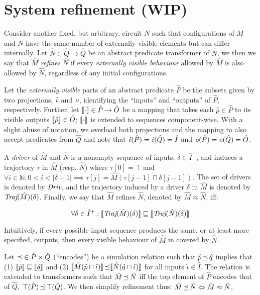 \section{System refinement (WIP)}

Consider another fixed, but arbitrary, circuit $N$ such that configurations of $M$ and $N$ have the same number of externally visible elements but can differ internally. Let $\hat N \in \hat Q \rightarrow \hat Q$ be an abstract predicate transformer of $N$, we then we say that $\hat M$ \textit{refines} $\hat N$ if every \textit{externally visible behaviour} allowed by $\hat M$ is also allowed by $\hat N$, regardless of any initial configurations.

Let the \textit{externally visible} parts of an abstract predicate $\hat P$ be the subsets given by two projections, $\operatorname{\mathit{i}}$ and $\mathit{o}$, identifying the ``inputs'' and ``outputs'' of $\hat P$, respectively. Further, let $\llbracket\cdot\rrbracket \in \hat P \rightarrow \hat O$ be a mapping that takes each $\hat p \in \hat P$ to its visible outputs $\llbracket\hat p\rrbracket \in \hat O$; $\llbracket\cdot\rrbracket$ is extended to sequences component-wise. With a slight abuse of notation, we overload both projections and the mapping to also accept predicates from $\hat Q$ and note that $\operatorname{\mathit{i}}(\hat P) = \operatorname{\mathit{i}}(\hat Q) = \hat I$ and $\mathit{o}(\hat P) = \mathit{o}(\hat Q) = \hat O$.


A \textit{driver} of $\hat M$ and $\hat N$ is a nonempty sequence of inputs, $\delta \in \hat I^{+}$, and induces a trajectory $\tau$ in $\hat M$ (resp. $\hat N$) where $\tau[0] = \top$ and $\forall i \in \mathbb{N} : 0 < i < | \delta + 1 | \implies \tau[j] = \hat M(\tau[j-1] \sqcap \delta[j-1])$. The set of drivers is denoted by $\operatorname{\textit{Driv}}$, and the trajectory induced by a driver $\delta$ in $\hat M$ is denoted by $\operatorname{\textit{Traj}}(\hat M)(\delta)$. Finally, we say that $\hat M$ refines $\hat N$, denoted by $\hat M \approx \hat N$, iff:

\begin{equation*}
\forall \delta \in \hat I^{+} : \llbracket\operatorname{\textit{Traj}}(\hat M)(\delta)\rrbracket \sqsubseteq \llbracket\operatorname{\textit{Traj}}(\hat N)(\delta)\rrbracket
\end{equation*}

\noindent Intuitively, if every possible input sequence produces the same, or at least more specified, outputs, then every visible behaviour of $\hat M$ in covered by $\hat N$.

Let $\operatorname{\preceq} \in \hat P \times \hat Q$ (``encodes'') be a simulation relation such that $\hat p \operatorname{\preceq} \hat q$ implies that (1) $\llbracket\hat p\rrbracket \sqsubseteq \llbracket\hat q\rrbracket$ and (2) $\llbracket\hat M(\hat p \sqcap \hat \iota)\rrbracket \operatorname{\preceq} \llbracket\hat N(\hat q \sqcap \hat \iota)\rrbracket$ for all inputs $\hat \iota \in \hat I$. The relation is extended to transformers such that $\hat M \operatorname{\preceq} \hat N$ iff the top element of $\hat P$ encodes that of $\hat Q$, $\top(\hat P) \operatorname{\preceq} \top(\hat Q)$. We then simplify refinement thus: $\hat M \operatorname{\preceq} \hat N \Leftrightarrow \hat M \approx \hat N$.

